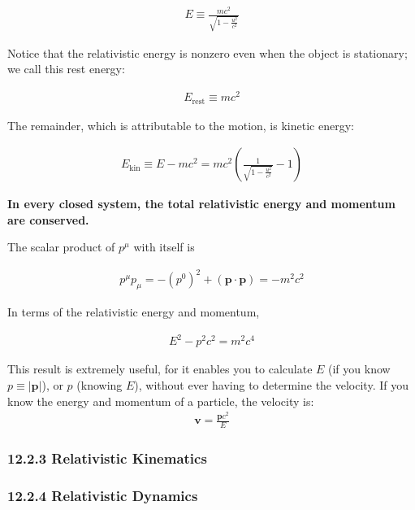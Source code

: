 \documentclass[11pt,letterpaper]{book}
\newcommand{\bm}[1]{\boldsymbol{#1}}
\begin{document}
        \begin{align}
        E \equiv \frac{mc^2}{\sqrt{1 - \frac{u^2}{c^2}}}
        \end{align}
        
        Notice that the relativistic energy is nonzero even when the object is stationary; we call this rest energy:
        
        \begin{align}
        E_\text{rest} \equiv mc^2
        \end{align}
        
        The remainder, which is attributable to the motion, is kinetic energy:
        
        \begin{align}
        E_\text{kin} \equiv E - mc^2 = mc^2 \left(\frac{1}{\sqrt{1 - \frac{u^2}{c^2}}} - 1\right)
        \end{align}

        \begin{center}
            \textbf{In every closed system, the total relativistic energy and momentum are conserved.}
        \end{center}
        
        The scalar product of \( p^\mu \) with itself is
        
        \begin{align}
        p^\mu p_\mu = -(p^0)^2 + (\bm{p} \cdot \bm{p}) = -m^2c^2
        \end{align}
        
        In terms of the relativistic energy and momentum,
        
        \begin{align}
        E^2 - p^2c^2 = m^2c^4 
        \end{align}
        
        This result is extremely useful, for it enables you to calculate \(E\) (if you know \( p \equiv |\bm{p}| \)), or \( p \) (knowing \( E \)), without ever having to determine the velocity. If you know the energy and momentum of a particle, the velocity is: 
        \begin{align}
        \bm{v}=\frac{\bm{p}c^2}{E}
        \end{align}
        
    \subsubsection{12.2.3 Relativistic Kinematics}
    \subsubsection{12.2.4 Relativistic Dynamics}
\end{document}

